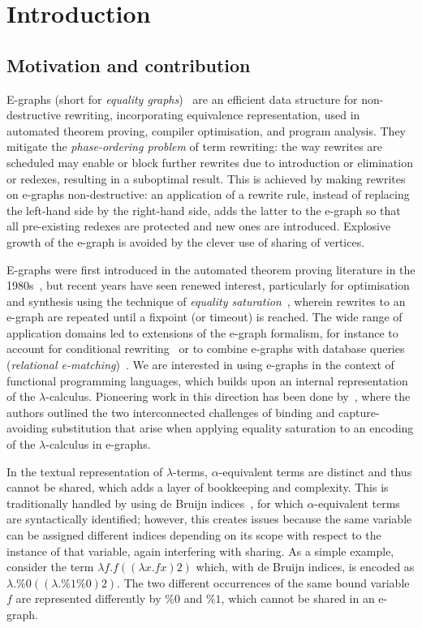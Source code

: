 \section{Introduction}%
\label{sec:introduction}

\subsection{Motivation and contribution}

E-graphs (short for \emph{equality graphs})~\cite{EggPaper} are an efficient data structure for non-destructive rewriting, incorporating equivalence representation, used in automated theorem proving, compiler optimisation, and program analysis.
They mitigate the \emph{phase-ordering problem} of term rewriting: the way rewrites are scheduled may enable or block further rewrites due to introduction or elimination or redexes, resulting in a suboptimal result.
This is achieved by making rewrites on e-graphs non-destructive: an application of a rewrite rule, instead of replacing the left-hand side by the right-hand side, adds the latter to the e-graph so that all pre-existing redexes are protected and new ones are introduced.
Explosive growth of the e-graph is avoided by the clever use of sharing of vertices.

E-graphs were first introduced in the automated theorem proving literature in the 1980s~\cite{nelson1980techniques}, but recent years have seen renewed interest, particularly for optimisation and synthesis using the technique of \emph{equality saturation}~\cite{10.1145/1594834.1480915, flatt2022_small, EggPaper,flatt_small_2022}, wherein rewrites to an e-graph are repeated until a fixpoint (or timeout) is reached.
The wide range of application domains led to extensions of the e-graph formalism, for instance to account for conditional rewriting~\cite{singher2023colored} or  to combine e-graphs with database queries (\emph{relational e-matching})~\cite{zhang_relational_2022}.
We are interested in using e-graphs in the context of functional programming languages, which builds upon an internal representation of the $\lambda$-calculus.
Pioneering work in this direction has been done by~\citet{koehler2022sketchguided}, where the authors outlined the two interconnected challenges of binding and capture-avoiding substitution that arise when applying equality saturation to an encoding of the $\lambda$-calculus in e-graphs.

In the textual representation of $\lambda$-terms, $\alpha$-equivalent terms are distinct and thus cannot be shared, which adds a layer of bookkeeping and complexity.
This is traditionally handled by using de Bruijn indices~\cite{de1972lambda}, for which $\alpha$-equivalent terms are syntactically identified; however, this creates issues because the same variable can be assigned different indices depending on its scope with respect to the instance of that variable, again interfering with sharing.
As a simple example, consider the term $\lambda f . f ((\lambda x . f x) 2)$ which, with de Bruijn indices,  is encoded as $\lambda . \%0 ((\lambda . \%1 \%0) 2)$.
The two different occurrences of the same bound variable $f$ are represented differently by $\%0$ and $\%1$, which cannot be shared in an e-graph.

